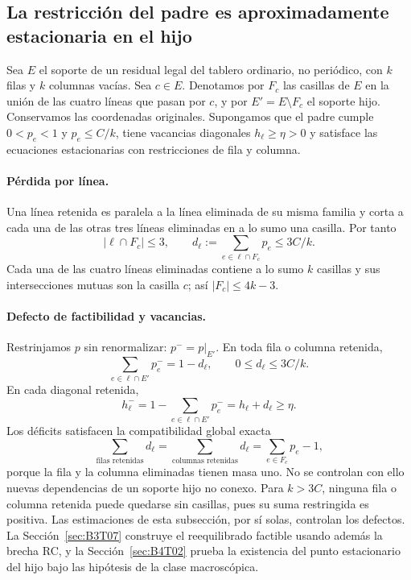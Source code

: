 \subsection{La restricción del padre es aproximadamente estacionaria en el hijo}\label{sec:B3T04}
Sea $E$ el soporte de un residual legal del tablero ordinario, no periódico,
con $k$ filas y $k$ columnas vacías.
Sea $c\in E$. Denotamos por $F_c$ las casillas de $E$ en la unión de las
cuatro líneas que pasan por $c$, y por $E'=E\setminus F_c$ el soporte hijo.
Conservamos las coordenadas originales. Supongamos que el padre cumple
$0<p_e<1$ y $p_e\le C/k$, tiene vacancias diagonales $h_\ell\ge\eta>0$ y satisface las
ecuaciones estacionarias con restricciones de fila y columna.
\paragraph{Pérdida por línea.}
Una línea retenida es paralela a la línea eliminada de su misma familia
y corta a cada una de las otras tres líneas eliminadas en a lo sumo
una casilla. Por tanto
\[
 |\ell\cap F_c|\le3,\qquad
 d_\ell:=\sum_{e\in\ell\cap F_c}p_e\le3C/k.
\]
Cada una de las cuatro líneas eliminadas contiene a lo sumo $k$ casillas
y sus intersecciones mutuas son la casilla $c$; así $|F_c|\le4k-3$.
\paragraph{Defecto de factibilidad y vacancias.}
Restrinjamos $p$ sin renormalizar: $p^-=p|_{E'}$.
En toda fila o columna retenida,
\[
 \sum_{e\in\ell\cap E'}p_e^-=1-d_\ell,\qquad 0\le d_\ell\le3C/k.
\]
En cada diagonal retenida,
\[
 h_\ell^-=1-\sum_{e\in\ell\cap E'}p_e^-=h_\ell+d_\ell\ge\eta.
\]
Los déficits satisfacen la compatibilidad global exacta
\[
 \sum_{\text{filas retenidas}}d_\ell
 =\sum_{\text{columnas retenidas}}d_\ell
 =\sum_{e\in F_c}p_e-1,
\]
porque la fila y la columna eliminadas tienen masa uno. No se controlan
con ello nuevas dependencias de un soporte hijo no conexo.
Para $k>3C$, ninguna fila o columna retenida puede quedarse sin casillas,
pues su suma restringida es positiva. Las estimaciones de esta subsección, por sí solas,
controlan los defectos. La Sección~\ref{sec:B3T07} construye el reequilibrado factible usando
además la brecha RC, y la Sección~\ref{sec:B4T02} prueba la existencia del punto estacionario del
hijo bajo las hipótesis de la clase macroscópica.


